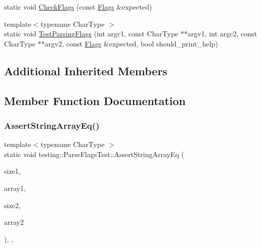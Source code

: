 \begin{DoxyCompactItemize}
\item 
static void \mbox{\hyperlink{classtesting_1_1_parse_flags_test_a5919553c35ebe3910fcff51cc0b59fd6}{Check\+Flags}} (const \mbox{\hyperlink{structtesting_1_1_flags}{Flags}} \&expected)
\item 
{\footnotesize template$<$typename Char\+Type $>$ }\\static void \mbox{\hyperlink{classtesting_1_1_parse_flags_test_ad769e5f5a71939c3a9ad853b415fa9d2}{Test\+Parsing\+Flags}} (int argc1, const Char\+Type $\ast$$\ast$argv1, int argc2, const Char\+Type $\ast$$\ast$argv2, const \mbox{\hyperlink{structtesting_1_1_flags}{Flags}} \&expected, bool should\+\_\+print\+\_\+help)
\end{DoxyCompactItemize}
\subsection*{Additional Inherited Members}


\subsection{Member Function Documentation}
\mbox{\label{classtesting_1_1_parse_flags_test_a5d93780e65e1aa304334a8d4372c51fc}} 
\subsubsection{\texorpdfstring{AssertStringArrayEq()}{AssertStringArrayEq()}\hspace{0.1cm}{\footnotesize\ttfamily [1/3]}}
{\footnotesize\ttfamily template$<$typename Char\+Type $>$ \\
static void testing\+::\+Parse\+Flags\+Test\+::\+Assert\+String\+Array\+Eq (\begin{DoxyParamCaption}\item[{size\+\_\+t}]{size1,  }\item[{Char\+Type $\ast$$\ast$}]{array1,  }\item[{size\+\_\+t}]{size2,  }\item[{Char\+Type $\ast$$\ast$}]{array2 }\end{DoxyParamCaption})\hspace{0.3cm}{\ttfamily [inline]}, {\ttfamily [static]}, {\ttfamily [protected]}}

